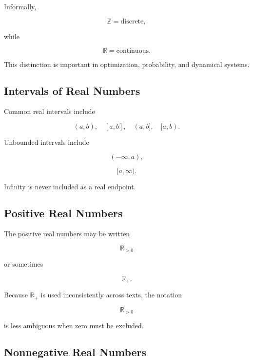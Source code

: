 Informally,

\[
\boxed{
\mathbb{Z}
=
\text{discrete},
}
\]

while

\[
\boxed{
\mathbb{R}
=
\text{continuous}.
}
\]

This distinction is important in optimization, probability, and dynamical
systems.

\subsection{Intervals of Real Numbers}
\label{subsec:real-intervals-number-systems}

Common real intervals include

\[
\boxed{
(a,b),
\quad
[a,b],
\quad
(a,b],
\quad
[a,b).
}
\]

Unbounded intervals include

\[
\boxed{
(-\infty,a),
}
\]

\[
\boxed{
[a,\infty).
}
\]

Infinity is never included as a real endpoint.

\subsection{Positive Real Numbers}
\label{subsec:positive-real-numbers-reference}

The positive real numbers may be written

\[
\boxed{
\mathbb{R}_{>0}
}
\]

or sometimes

\[
\boxed{
\mathbb{R}_+.
}
\]

Because \(\mathbb{R}_+\) is used inconsistently across texts, the notation

\[
\boxed{
\mathbb{R}_{>0}
}
\]

is less ambiguous when zero must be excluded.

\subsection{Nonnegative Real Numbers}
\label{subsec:nonnegative-real-reference}


